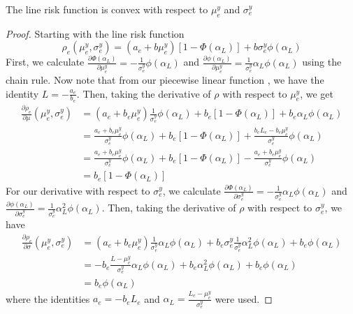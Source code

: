 \begin{lemma}
The line risk function  is convex with respect to $\mu^y_e$ and $\sigma^y_e$
\end{lemma}
\begin{proof}
Starting with the line risk function 
\begin{equation*}
\rho_e(\mu^y_e,\sigma^y_e) = (a_e + b \mu^y_e)\left[ 1 - \Phi(\alpha_L) \right]  + b \sigma^y_e \phi(\alpha_L) 
\end{equation*}
First, we calculate $\frac{\partial \Phi(\alpha_L)}{\partial \mu^y_e} = - \frac{1}{\sigma^y_e} \phi(\alpha_L)$ and $\frac{\partial \phi(\alpha_L)}{\partial \mu^y_e} =  \frac{1}{\sigma^y_e} \alpha_L \phi(\alpha_L)$ using the chain rule.  Now note that from our piecewise linear function , we have the identity $L = -\frac{a_e}{b_e}$. Then, taking the derivative of $\rho$ with respect to $\mu^y_e$, we get  
\begin{align*}
\frac{\partial \rho_e}{\partial \mu}(\mu^y_e,\sigma^y_e) &= (a_e + b_e \mu^y_e) \frac{1}{\sigma^y_e} \phi(\alpha_L) + b_e \left[ 1 - \Phi(\alpha_L) \right] + b_e \alpha_L \phi(\alpha_L)\\
&= \frac{a_e + b_e \mu^y_e}{\sigma^y_e}\phi(\alpha_L)  + b_e \left[ 1 - \Phi(\alpha_L) \right] +  \frac{b_e L_e - b_e\mu^y_e}{\sigma^y_e}\phi(\alpha_L) \\
&= \frac{a_e + b_e \mu^y_e}{\sigma^y_e}\phi(\alpha_L)  + b_e \left[ 1 - \Phi(\alpha_L) \right] -  \frac{a_e + b_e\mu^y_e}{\sigma^y_e}\phi(\alpha_L)\\
& = b_e\left[ 1 - \Phi(\alpha_L) \right]
\end{align*}
For our derivative with respect to $\sigma^y_e$, we calculate $\frac{\partial \Phi(\alpha_L)}{\partial \sigma^y_e} = - \frac{1}{\sigma^y_e} \alpha_L \phi(\alpha_L)$ and $\frac{\partial \phi(\alpha_L)}{\partial \sigma^y_e} =  \frac{1}{\sigma^y_e} \alpha_L^2 \phi(\alpha_L)$.  Then, taking the derivative of $\rho$ with respect to $\sigma^y_e$, we have
\begin{align*}
\frac{\partial \rho_e}{\partial \sigma}(\mu^y_e,\sigma^y_e) & = (a_e+b_e\mu^y_e)\frac{1}{\sigma^y_e} \alpha_L  \phi(\alpha_L) + b_e \sigma^y_e \frac{1}{\sigma^y_e} \alpha_L^2  \phi(\alpha_L) + b_e \phi(\alpha_L)\\
& = -b_e\frac{L-\mu^y_e}{\sigma^y_e} \alpha_L  \phi(\alpha_L) + b_e \alpha_L^2  \phi(\alpha_L) + b_e \phi(\alpha_L)\\
 & = b_e \phi(\alpha_L) 
\end{align*} 
where the identities $a_e=-b_eL_e$ and $\alpha_L = \frac{L_e-\mu^y_e}{\sigma^y_e}$ were used.


\end{proof}

